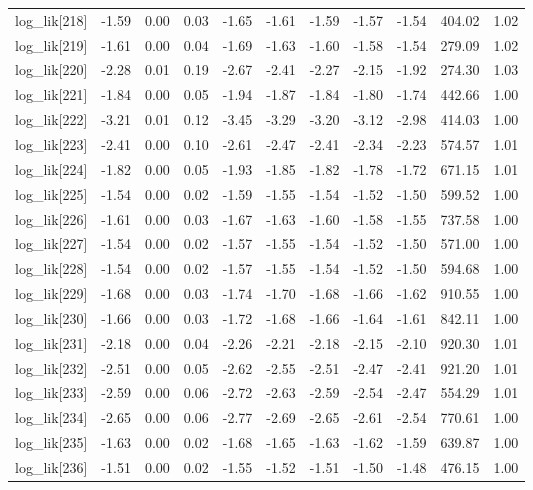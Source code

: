 \begin{table}[ht]
\begin{tabular}{rrrrrrrrrrr}
  log\_lik[218] & -1.59 & 0.00 & 0.03 & -1.65 & -1.61 & -1.59 & -1.57 & -1.54 & 404.02 & 1.02 \\ 
  log\_lik[219] & -1.61 & 0.00 & 0.04 & -1.69 & -1.63 & -1.60 & -1.58 & -1.54 & 279.09 & 1.02 \\ 
  log\_lik[220] & -2.28 & 0.01 & 0.19 & -2.67 & -2.41 & -2.27 & -2.15 & -1.92 & 274.30 & 1.03 \\ 
  log\_lik[221] & -1.84 & 0.00 & 0.05 & -1.94 & -1.87 & -1.84 & -1.80 & -1.74 & 442.66 & 1.00 \\ 
  log\_lik[222] & -3.21 & 0.01 & 0.12 & -3.45 & -3.29 & -3.20 & -3.12 & -2.98 & 414.03 & 1.00 \\ 
  log\_lik[223] & -2.41 & 0.00 & 0.10 & -2.61 & -2.47 & -2.41 & -2.34 & -2.23 & 574.57 & 1.01 \\ 
  log\_lik[224] & -1.82 & 0.00 & 0.05 & -1.93 & -1.85 & -1.82 & -1.78 & -1.72 & 671.15 & 1.01 \\ 
  log\_lik[225] & -1.54 & 0.00 & 0.02 & -1.59 & -1.55 & -1.54 & -1.52 & -1.50 & 599.52 & 1.00 \\ 
  log\_lik[226] & -1.61 & 0.00 & 0.03 & -1.67 & -1.63 & -1.60 & -1.58 & -1.55 & 737.58 & 1.00 \\ 
  log\_lik[227] & -1.54 & 0.00 & 0.02 & -1.57 & -1.55 & -1.54 & -1.52 & -1.50 & 571.00 & 1.00 \\ 
  log\_lik[228] & -1.54 & 0.00 & 0.02 & -1.57 & -1.55 & -1.54 & -1.52 & -1.50 & 594.68 & 1.00 \\ 
  log\_lik[229] & -1.68 & 0.00 & 0.03 & -1.74 & -1.70 & -1.68 & -1.66 & -1.62 & 910.55 & 1.00 \\ 
  log\_lik[230] & -1.66 & 0.00 & 0.03 & -1.72 & -1.68 & -1.66 & -1.64 & -1.61 & 842.11 & 1.00 \\ 
  log\_lik[231] & -2.18 & 0.00 & 0.04 & -2.26 & -2.21 & -2.18 & -2.15 & -2.10 & 920.30 & 1.01 \\ 
  log\_lik[232] & -2.51 & 0.00 & 0.05 & -2.62 & -2.55 & -2.51 & -2.47 & -2.41 & 921.20 & 1.01 \\ 
  log\_lik[233] & -2.59 & 0.00 & 0.06 & -2.72 & -2.63 & -2.59 & -2.54 & -2.47 & 554.29 & 1.01 \\ 
  log\_lik[234] & -2.65 & 0.00 & 0.06 & -2.77 & -2.69 & -2.65 & -2.61 & -2.54 & 770.61 & 1.00 \\ 
  log\_lik[235] & -1.63 & 0.00 & 0.02 & -1.68 & -1.65 & -1.63 & -1.62 & -1.59 & 639.87 & 1.00 \\ 
  log\_lik[236] & -1.51 & 0.00 & 0.02 & -1.55 & -1.52 & -1.51 & -1.50 & -1.48 & 476.15 & 1.00 \\ 

\end{tabular}
\end{table}
